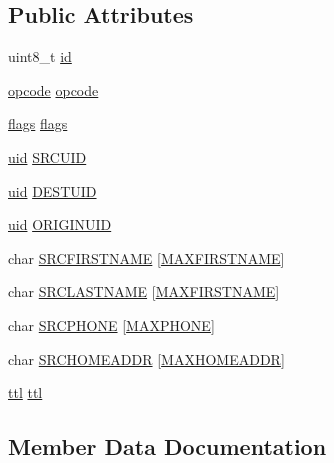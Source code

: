\subsection*{Public Attributes}
\begin{DoxyCompactItemize}
\item 
uint8\+\_\+t \hyperlink{struct_packet_a5167d164b320ac43373775bbf1546d2f}{id}
\item 
\hyperlink{packet_8h_a5ce68aceddf17a30aa045fc04914e798}{opcode} \hyperlink{struct_packet_add7e8d0db5c932cdf6ff0252697b88b0}{opcode}
\item 
\hyperlink{flags_8h_a261da8bdf9ce262f07bc17c9b2834bb5}{flags} \hyperlink{struct_packet_a06b33fa705a08bf26d8f15f4e5a5eacc}{flags}
\item 
\hyperlink{packet_8h_ac065f913fb79988aec421b0f5eebbc77}{uid} \hyperlink{struct_packet_a3cef7ca885da48680c0646ae307db4a4}{S\+R\+C\+U\+ID}
\item 
\hyperlink{packet_8h_ac065f913fb79988aec421b0f5eebbc77}{uid} \hyperlink{struct_packet_ad4f0e5f73729e408a82f9792c67680d2}{D\+E\+S\+T\+U\+ID}
\item 
\hyperlink{packet_8h_ac065f913fb79988aec421b0f5eebbc77}{uid} \hyperlink{struct_packet_aa3bf059f5b682b83661111cb32720455}{O\+R\+I\+G\+I\+N\+U\+ID}
\item 
char \hyperlink{struct_packet_a0001fb805cfd15a0776622ff27135a02}{S\+R\+C\+F\+I\+R\+S\+T\+N\+A\+ME} \mbox{[}\hyperlink{packet_8h_ac3dd1c10edba39fc5737be5b96a91d2a}{M\+A\+X\+F\+I\+R\+S\+T\+N\+A\+ME}\mbox{]}
\item 
char \hyperlink{struct_packet_a2499b774247b7a099cf3878265d23a2f}{S\+R\+C\+L\+A\+S\+T\+N\+A\+ME} \mbox{[}\hyperlink{packet_8h_ac3dd1c10edba39fc5737be5b96a91d2a}{M\+A\+X\+F\+I\+R\+S\+T\+N\+A\+ME}\mbox{]}
\item 
char \hyperlink{struct_packet_ab1db398486aded3d3f00350f1ac77458}{S\+R\+C\+P\+H\+O\+NE} \mbox{[}\hyperlink{packet_8h_a2f035f148b6abcc902e7711997c031d7}{M\+A\+X\+P\+H\+O\+NE}\mbox{]}
\item 
char \hyperlink{struct_packet_a4bac977ea6fbf7dd57a22398aa280fca}{S\+R\+C\+H\+O\+M\+E\+A\+D\+DR} \mbox{[}\hyperlink{packet_8h_acc141dd006defc06f8e58a57259526f9}{M\+A\+X\+H\+O\+M\+E\+A\+D\+DR}\mbox{]}
\item 
\hyperlink{packet_8h_a22ca626eb8f0deb847d1fae89476e26d}{ttl} \hyperlink{struct_packet_a63433ac4a59b48ac4c2dee5c330eb99d}{ttl}
\end{DoxyCompactItemize}


\subsection{Member Data Documentation}
\mbox{\label{struct_packet_ad4f0e5f73729e408a82f9792c67680d2}} 
